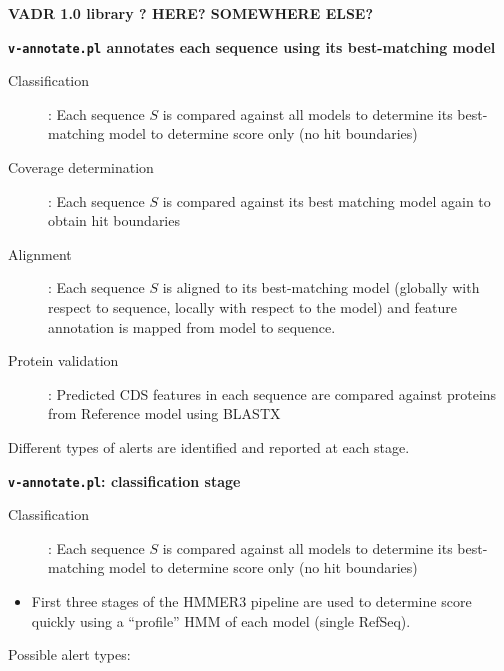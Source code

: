 \documentclass[landscape]{slides}
\begin{document}
\begin{slide}
\begin{center}
\textbf{VADR 1.0 library ? HERE? SOMEWHERE ELSE? }
\end{center}

\vfill

\end{slide}
\begin{slide}
\begin{center}
\textbf{\texttt{v-annotate.pl} annotates each sequence using its
  best-matching model}

\begin{description}
\item[Classification]: Each sequence $S$ is compared against all models 
  to determine its best-matching model to determine score only (no
  hit boundaries)

\item[Coverage determination]: Each sequence $S$ is compared against
  its best matching model again to obtain hit boundaries

\item[Alignment]: Each sequence $S$ is aligned to its best-matching
  model (globally with respect to sequence, locally with respect to
  the model) and feature annotation is mapped from model to sequence.

\item[Protein validation]: Predicted CDS features in each sequence are
  compared against proteins from Reference model using BLASTX
\end{description}

Different types of alerts are identified and reported at each stage.

\end{center}

\vfill
\end{slide}
\begin{slide}
\begin{center}
\textbf{\texttt{v-annotate.pl}: classification stage}
\end{center}

\begin{description}
\item[Classification]: Each sequence $S$ is compared against all models 
  to determine its best-matching model to determine score only (no
  hit boundaries)
\end{description}

\begin{itemize} 
\item First three stages of the HMMER3 pipeline are used to
  determine score quickly using a ``profile'' HMM of each model
  (single RefSeq).
\end{itemize}

Possible alert types:

\vfill
\end{slide}
\end{document}

